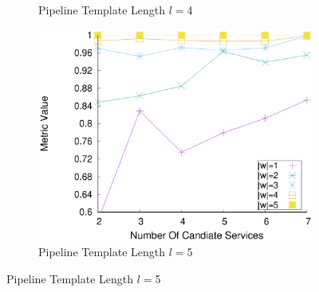 \begin{figure}[ht!]
\begin{subfigure}{0.49\textwidth}
        \caption{Pipeline Template Length $l$$=$4}
        \label{fig:quality_window_wide_perce_n4}
      \end{subfigure}
      \hfill
      \begin{subfigure}{0.49\textwidth}
        \includegraphics[width=\textwidth]{Images/graphs/window_quality_performance_diff_perce_n7_s7_20_100_n5}
        \caption{Pipeline Template Length $l$$=$5}


\end{subfigure}
\end{figure}
